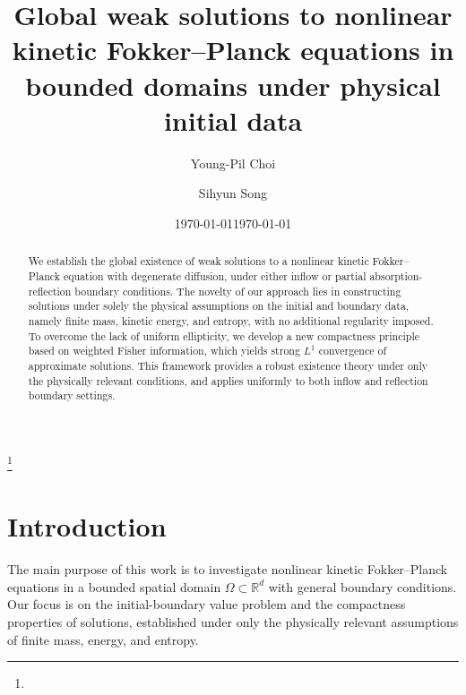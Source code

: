 \documentclass[10pt, reqno]{amsart}
\date{\today}
\theoremstyle{plain}
\theoremstyle{definition}
\theoremstyle{remark}
\numberwithin{equation}{section}
\newcommand{\R}{\mathbb{R}}
\begin{document}
\title[Nonlinear kinetic Fokker--Planck equations in bounded domains]{Global weak solutions to nonlinear kinetic Fokker--Planck equations in bounded domains under physical initial data}



\author{Young-Pil Choi}
\address{Department of Mathematics, Yonsei University, Seoul 03722, Republic of Korea}

\author{Sihyun Song}
\address{Department of Mathematics, Yonsei University, Seoul 03722, Republic of Korea}


\date{\today}
\thanks{ }

\begin{abstract}
We establish the global existence of weak solutions to a nonlinear kinetic Fokker--Planck equation with degenerate diffusion, under either inflow or partial absorption-reflection boundary conditions. The novelty of our approach lies in constructing solutions under solely the physical assumptions on the initial and boundary data, namely finite mass, kinetic energy, and entropy, with no additional regularity imposed. To overcome the lack of uniform ellipticity, we develop a new compactness principle based on weighted Fisher information, which yields strong $L^1$ convergence of approximate solutions. This framework provides a robust existence theory under only the physically relevant conditions, and applies uniformly to both inflow and reflection boundary settings.
\end{abstract}

\maketitle
\tableofcontents

\singlespacing
%
%
%
%
%
%
\section{Introduction}
The main purpose of this work is to investigate nonlinear kinetic Fokker--Planck equations in a bounded spatial domain $\Omega \subset \R^d$ with general boundary conditions. Our focus is on the initial-boundary value problem and the compactness properties of solutions, established under only the physically relevant assumptions of finite mass, energy, and entropy. 
\end{document}

